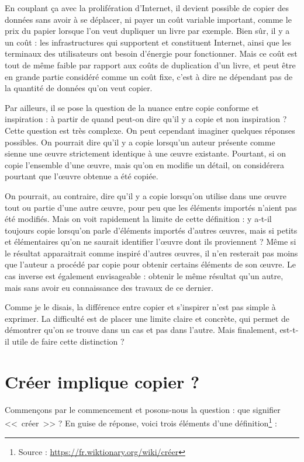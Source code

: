 En couplant ça avec la prolifération d'Internet, il devient possible de copier des données sans avoir à se déplacer, ni payer un coût variable important, comme le prix du papier lorsque l'on veut dupliquer un livre par exemple.
Bien sûr, il y a un coût : les infrastructures qui supportent et constituent Internet, ainsi que les terminaux des utilisateurs ont besoin d'énergie pour fonctionner.
Mais ce coût est tout de même faible par rapport aux coûts de duplication d'un livre, et peut être en grande partie considéré comme un coût fixe, c'est à dire ne dépendant pas de la quantité de données qu'on veut copier.

Par ailleurs, il se pose la question de la nuance entre copie conforme et inspiration : à partir de quand peut-on dire qu'il y a copie et non inspiration ?
Cette question est très complexe.
On peut cependant imaginer quelques réponses possibles.
On pourrait dire qu'il y a copie lorsqu'un auteur présente comme sienne une œuvre strictement identique à une œuvre existante.
Pourtant, si on copie l'ensemble d'une œuvre, mais qu'on en modifie un détail, on considérera pourtant 	que l'œuvre obtenue a été copiée.

On pourrait, au contraire, dire qu'il y a copie lorsqu'on utilise dans une œuvre tout ou partie d'une autre œuvre, pour peu que les éléments importés n'aient pas été modifiés.
Mais on voit rapidement la limite de cette définition : y a-t-il toujours copie lorsqu'on parle d'éléments importés d'autres œuvres, mais si petits et élémentaires qu'on ne saurait identifier l'œuvre dont ils proviennent ?
Même si le résultat apparaitrait comme inspiré d'autres œuvres, il n'en resterait pas moins que l'auteur a procédé par copie pour obtenir certains éléments de son œuvre.
Le cas inverse est également envisageable : obtenir le même résultat qu'un autre, mais sans avoir eu connaissance des travaux de ce dernier.

Comme je le disais, la différence entre copier et s'inspirer n'est pas simple à exprimer.
La difficulté est de placer une limite claire et concrète, qui permet de démontrer qu'on se trouve dans un cas et pas dans l'autre.
Mais finalement, est-t-il utile de faire cette distinction ?

\section{Créer implique copier ?}

Commençons par le commencement et posons-nous la question : que signifier <<~créer~>> ?
En guise de réponse, voici trois éléments d'une définition\footnote{Source : \url{https://fr.wiktionary.org/wiki/créer}} :

